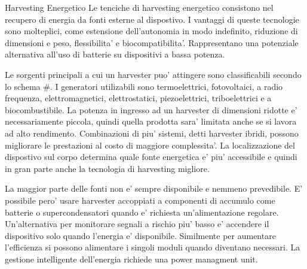 \begin{section}{Harvesting Energetico}
    Le tenciche di harvesting energetico consistono nel recupero di energia da fonti esterne al dispostivo. I vantaggi di queste tecnologie sono molteplici, come estensione dell'autonomia in modo indefinito, riduzione di dimensioni e peso, flessibilita' e biocompatibilita'. Rappresentano una potenziale alternativa all'uso di batterie su dispositivi a bassa potenza.

    Le sorgenti principali a cui un harvester puo' attingere sono classificabili secondo lo schema \#. I generatori utilizabili sono termoelettrici, fotovoltaici, a radio frequenza, elettromagnetici, elettrostatici, piezoelettrici, triboelettrici e a biocombustibile. La potenza in ingresso ad un harvester di dimensioni ridotte e' necessariamente piccola, quindi quella prodotta sara' limitata anche se si lavora ad alto rendimento. Combinazioni di piu' sistemi, detti harvester ibridi, possono migliorare le prestazioni al costo di maggiore complessita'. La localizzazione del dispostivo sul corpo determina quale fonte energetica e' piu' accessibile e quindi in gran parte anche la tecnologia di harvesting migliore. 
    
    La maggior parte delle fonti non e' sempre disponibile e nemmeno prevedibile. E' possibile pero' usare harvester accoppiati a componenti di accumulo come batterie o supercondensatori quando e' richiesta un'alimentazione regolare. Un'alternativa per monitorare segnali a rischio piu' basso e' accendere il dispositivo solo quando l'energia e' disponibile. Similmente per aumentare l'efficienza si possono alimentare i singoli moduli quando diventano necessari. La gestione intelligente dell'energia richiede una power managment unit.
\end{section}

